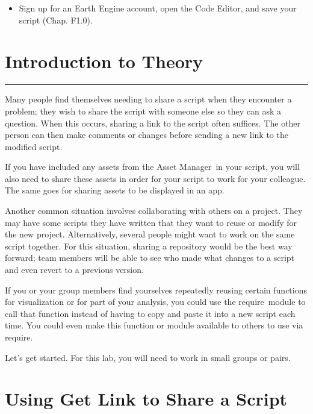 \documentclass[
  letterpaper,
  DIV=11,
  numbers=noendperiod]{scrreprt}
\providecommand{\tightlist}{%
  \setlength{\itemsep}{0pt}\setlength{\parskip}{0pt}}\usepackage{longtable,booktabs,array}
\begin{document}

\begin{itemize}
\tightlist
\item
  Sign up for an Earth Engine account, open the Code Editor, and save
  your script (Chap. F1.0).
\end{itemize}

\hypertarget{introduction-to-theory-15}{%
\section*{Introduction to Theory}\label{introduction-to-theory-15}}


\begin{center}\rule{0.5\linewidth}{0.5pt}\end{center}

Many people find themselves needing to share a script when they
encounter a problem; they wish to share the script with someone else so
they can ask a question. When this occurs, sharing a link to the script
often suffices. The other person can then make comments or changes
before sending a new link to the modified script.

If you have included any assets from the Asset Manager~in your script,
you will also need to share these assets in order for your script to
work for your colleague. The same goes for sharing assets to be
displayed in an app.

Another common situation involves collaborating with others on a
project. They may have some scripts they have written that they want to
reuse or modify for the new project. Alternatively, several people might
want to work on the same script together. For this situation, sharing a
repository would be the best way forward; team members will be able to
see who made what changes to a script and even revert to a previous
version.

If you or your group members find yourselves repeatedly reusing certain
functions for visualization or for part of your analysis, you could use
the require~module to call that function instead of having to copy and
paste it into a new script each time. You could even make this function
or module available to others to use via require.

Let's get started. For this lab, you will need to work in small groups
or pairs.

\hypertarget{using-get-link-to-share-a-script}{%
\section{Using Get Link to Share a
Script}\label{using-get-link-to-share-a-script}}
\end{document}
